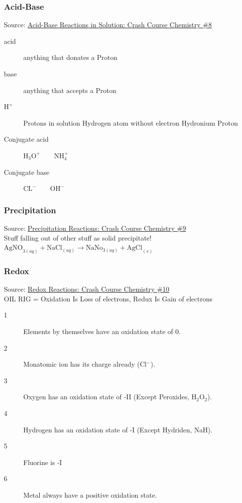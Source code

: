 \subsubsection{Acid-Base}
Source: \href{https://www.youtube.com/watch?v=ANi709MYnWg&list=PL8dPuuaLjXtPHzzYuWy6fYEaX9mQQ8oGr&index=9}{Acid-Base Reactions in Solution: Crash Course Chemistry \#8}

\begin{description}
    \item[acid] anything that donates a Proton
    \item[base] anything that accepts a Proton 
    \item[$\text{H}^+$] Protons in solution \arrow Hydrogen atom without electron \arrow Hydronium \arrow Proton
    \item[Conjugate acid] $\text{H}_3\text{O}^+ \qquad \text{N}\text{H}_4^+$ 
    \item[Conjugate base] $\text{C}\text{L}^- \qquad \text{O}\text{H}^-$ 
\end{description}

\subsubsection{Precipitation}
Source: \href{https://www.youtube.com/watch?v=IIu16dy3ThI&list=PL8dPuuaLjXtPHzzYuWy6fYEaX9mQQ8oGr&index=10}{Precipitation Reactions: Crash Course Chemistry \#9}
\\
Stuff falling out of other stuff as solid precipitate!\\
$\text{AgNO}_{3(aq)}+\text{NaCl}_{(aq)} \to \text{NaNo}_{3(aq)} + \text{AgCl}_{(s)}$
\subsubsection{Redox}
Source: \href{https://www.youtube.com/watch?v=lQ6FBA1HM3s&list=PL8dPuuaLjXtPHzzYuWy6fYEaX9mQQ8oGr&index=11}{Redox Reactions: Crash Course Chemistry \#10}
\\
OIL RIG = Oxidation Is Loss of electrons, Redux Is Gain of electrons\\

\begin{description}
    \item[1] Elements by themselves have an oxidation state of 0.
    \item[2] Monatomic ion has its charge already (Cl$^-$).
    \item[3] Oxygen has an oxidation state of -II (Except Peroxides, H$_2$O$_2$).
    \item[4] Hydrogen has an oxidation state of -I (Except Hydriden, NaH).
    \item[5] Fluorine is -I
    \item[6] Metal always have a positive oxidation state. 
\end{description}

